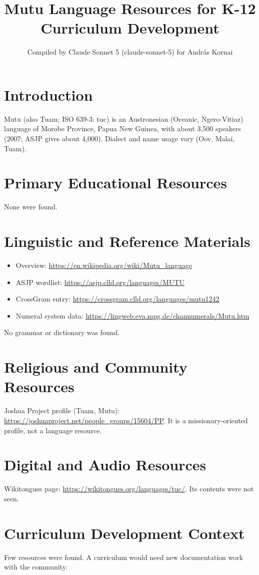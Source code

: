 \documentclass[12pt]{article}
\title{Mutu Language Resources for K-12 Curriculum Development}
\author{Compiled by Claude Sonnet 5 (claude-sonnet-5) for Andr\'as Kornai}
\date{}
\begin{document}
\maketitle

\section{Introduction}
Mutu (also Tuam; ISO 639-3: tuc) is an Austronesian (Oceanic, Ngero-Vitiaz) language of Morobe Province, Papua New Guinea, with about 3,500 speakers (2007; ASJP gives about 4,000). Dialect and name usage vary (Oov, Malai, Tuam).

\section{Primary Educational Resources}
None were found.

\section{Linguistic and Reference Materials}
\begin{itemize}
\item Overview: \url{https://en.wikipedia.org/wiki/Mutu_language}
\item ASJP wordlist: \url{https://asjp.clld.org/languages/MUTU}
\item CrossGram entry: \url{https://crossgram.clld.org/languages/mutu1242}
\item Numeral system data: \url{https://lingweb.eva.mpg.de/channumerals/Mutu.htm}
\end{itemize}
No grammar or dictionary was found.

\section{Religious and Community Resources}
Joshua Project profile (Tuam, Mutu): \url{https://joshuaproject.net/people_groups/15604/PP}. It is a missionary-oriented profile, not a language resource.

\section{Digital and Audio Resources}
Wikitongues page: \url{https://wikitongues.org/languages/tuc/}. Its contents were not seen.

\section{Curriculum Development Context}
Few resources were found. A curriculum would need new documentation work with the community.
\end{document}
